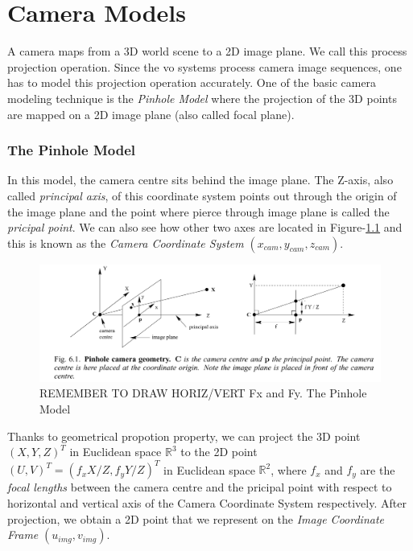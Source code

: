 \documentclass[a4paper]{report}
\numberwithin{figure}{section}
\begin{document}
\chapter{Camera Models} \label{cp_cam_models}

A camera maps from a 3D world scene to a 2D image plane. We call this process 
projection operation. Since the \acrshort{vo} systems process camera image 
sequences, one has to model this projection operation accurately. One of the 
basic camera modeling technique is the \textit{Pinhole Model} where the projection of 
the 3D points are mapped on a 2D image plane (also called focal plane). 

\subsection{The Pinhole Model} \label{sbsc_pinhole}

In this model, the camera centre sits behind the image plane.
The Z-axis, 
also called \textit{principal axis}, of this 
coordinate system points out through the origin of the image plane and the 
point where pierce through image plane is called the \textit{pricipal point}. 
We can also see how other two axes are located in Figure-\ref{fig:pinhole} 
and this is known as the \textit{Camera Coordinate System} $(x_{cam}, y_{cam}, z_{cam})$.


\begin{figure}[H]
	\centering
	\includegraphics[width=\linewidth,natwidth=640,natheight=640]
  {fig/ref_imgs/pinhole_model.png}
  \caption{REMEMBER TO DRAW HORIZ/VERT Fx and Fy. The Pinhole Model}
	\label{fig:pinhole}
\end{figure}

Thanks to geometrical propotion property, we can project 
the 3D point $(X, Y, Z)^T$ in Euclidean space $\mathbb{R}^3$
to the 2D point $(U,V)^T = (f_xX/Z, f_yY/Z)^T$ in Euclidean space $\mathbb{R}^2$, 
where $f_x$ and $f_y$ are the \textit{focal lengths} 
between the camera centre and the pricipal 
point with respect to horizontal and vertical axis of the Camera Coordinate 
System respectively.
After projection, we obtain a 2D 
point that we represent on the 
\textit{Image Coordinate Frame} $(u_{img},v_{img})$.
\end{document}
